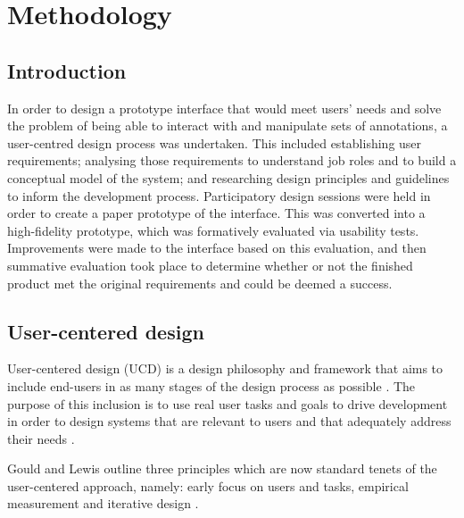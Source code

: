 
\chapter{Methodology} %

\label{Methodology} %


\section{Introduction}
In order to design a prototype interface that would meet users' needs and solve the problem of being able to interact with and manipulate sets of annotations, a user-centred design process was undertaken. This included establishing user requirements; analysing those requirements to understand job roles and to build a conceptual model of the system; and researching design principles and guidelines to inform the development process. Participatory design sessions were held in order to create a paper prototype of the interface. This was converted into a high-fidelity prototype, which was formatively evaluated via usability tests. Improvements were made to the interface based on this evaluation, and then summative evaluation took place to determine whether or not the finished product met the original requirements and could be deemed a success. 

\section{User-centered design}
User-centered design (UCD) is a design philosophy and framework that aims to include end-users in as many stages of the design process as possible \citep{Abras}. The purpose of this inclusion is to use real user tasks and goals to drive development in order to design systems that are relevant to users and that adequately address their needs \citep[p. 327]{RogersPreece}.

Gould and Lewis \citep{GouldLewis} outline three principles which are now standard tenets of the user-centered approach, namely: early focus on users and tasks, empirical measurement and iterative design \citep[p. 327]{RogersPreece}.
 
